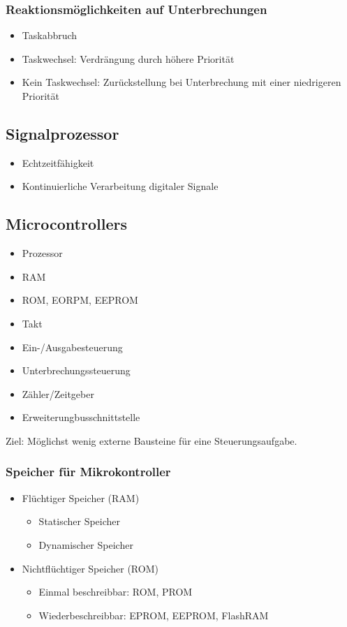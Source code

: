 \subsubsection{Reaktionsmöglichkeiten auf Unterbrechungen}
\begin{itemize}
	\item Taskabbruch
	\item Taskwechsel: Verdrängung durch höhere Priorität
	\item Kein Taskwechsel: Zurückstellung bei Unterbrechung mit einer niedrigeren Priorität
\end{itemize}


\subsection{Signalprozessor}
\begin{itemize}
	\item Echtzeitfähigkeit
	\item Kontinuierliche Verarbeitung digitaler Signale
\end{itemize}


\subsection{Microcontrollers}
\begin{itemize}
	\item Prozessor
	\item RAM
	\item ROM, EORPM, EEPROM
	\item Takt
	\item Ein-/Ausgabesteuerung
	\item Unterbrechungssteuerung
	\item Zähler/Zeitgeber
	\item Erweiterungbusschnittstelle
\end{itemize}
Ziel: Möglichst wenig externe Bausteine für eine Steuerungsaufgabe.

\subsubsection{Speicher für Mikrokontroller}
\begin{itemize}
	\item Flüchtiger Speicher (RAM)
	\begin{itemize}
		\item Statischer Speicher
		\item Dynamischer Speicher
	\end{itemize}
	\item Nichtflüchtiger Speicher (ROM)
	\begin{itemize}
		\item Einmal beschreibbar: ROM, PROM
		\item Wiederbeschreibbar: EPROM, EEPROM, FlashRAM
	\end{itemize}
\end{itemize}

